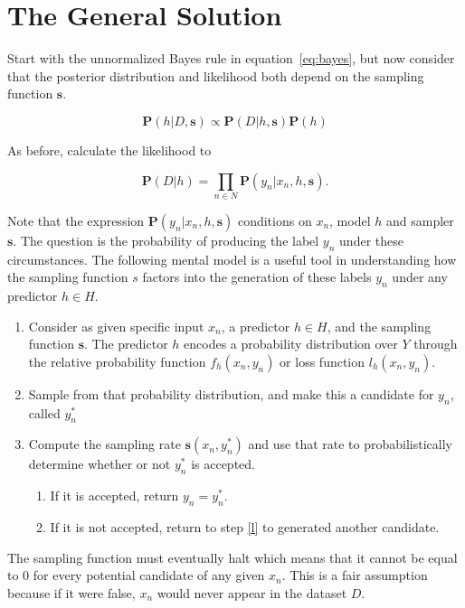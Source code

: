 \documentclass[twoside]{article}
\begin{document}
\section{The General Solution}
\label{section:solution}

Start with the unnormalized Bayes rule in equation~\eqref{eq:bayes}, but now consider that the posterior distribution and likelihood both depend on the sampling function \(\mathbf{s}\).

\[\mathbf{P}(h|D,\mathbf{s})\propto\mathbf{P}(D|h,\mathbf{s})\mathbf{P}(h)\]

As before, calculate the likelihood to

\[\mathbf{P}(D|h)=\prod_{n \in N} \mathbf{P}(y_n|x_n,h,\mathbf{s}).\]

Note that the expression \(\mathbf{P}(y_n|x_n,h,\mathbf{s})\) conditions on \(x_n\), model \(h\) and sampler \(\mathbf{s}\). The question is the probability of producing the label \(y_n\) under these circumstances. The following mental model is a useful tool in understanding how the sampling function \(s\) factors into the generation of these labels \(y_n\) under any predictor \(h \in H\).

\begin{enumerate}
	\item Consider as given specific input \(x_n\), a predictor \(h \in H\), and the sampling function \(\mathbf{s}\). The predictor \(h\) encodes a probability distribution over \(Y\) through the relative probability function \(f_h(x_n,y_n)\) or loss function \(l_h(x_n,y_n)\).
	\item \label{l} Sample from that probability distribution, and make this a candidate for \(y_n\), called \(y_n^*\)
	\item Compute the sampling rate \(\mathbf{s}(x_n,y_n^*)\) and use that rate to probabilistically determine whether or not \(y_n^*\) is accepted.
    \begin{enumerate}
        \item If it is accepted, return \(y_n=y_n^*\).
        \item If it is not accepted, return to step \ref{l} to generated another candidate.
    \end{enumerate}
\end{enumerate}

The sampling function must eventually halt which means that it cannot be equal to 0 for every potential candidate of any given \(x_n\). This is a fair assumption because if it were false, \(x_n\) would never appear in the dataset \(D\).
\end{document}
